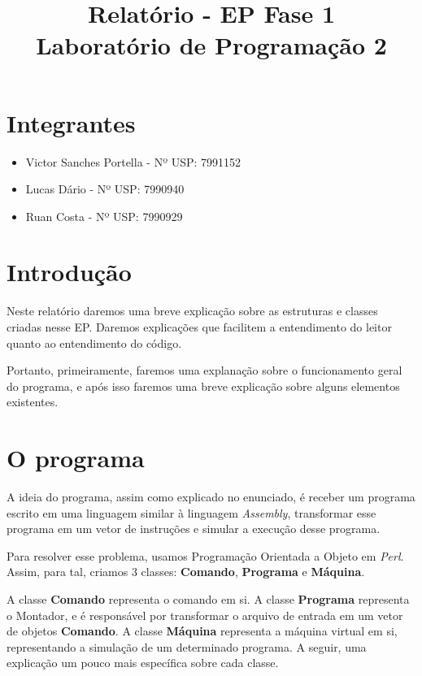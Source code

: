 \documentclass[11pt]{article}
\title{Relatório - EP Fase 1 \\ Laboratório de Programação 2}
\begin{document}
\maketitle

\section{Integrantes}

\begin{itemize}

\item Victor Sanches Portella - Nº USP: 7991152

\item Lucas Dário - Nº USP: 7990940

\item Ruan Costa - Nº USP: 7990929

\end{itemize}


\section{Introdução}

Neste relatório daremos uma breve explicação sobre as estruturas e classes
criadas nesse EP. Daremos explicações que facilitem a entendimento do leitor quanto ao entendimento do código.

Portanto, primeiramente, faremos uma explanação sobre o funcionamento geral do programa, e após isso faremos uma breve explicação sobre alguns elementos existentes.

\section{O programa}

A ideia do programa, assim como explicado no enunciado, é receber um programa escrito em uma linguagem similar à linguagem \emph{Assembly}, transformar esse programa em um vetor de instruções e simular a execução desse programa.

Para resolver esse problema, usamos Programação Orientada a Objeto em \emph{Perl}. Assim, para tal, criamos 3 classes: \textbf{\color{red}Comando}, \textbf{\color{red}Programa} e \textbf{\color{red}Máquina}.

A classe \textbf{\color{red}Comando} representa o comando em si. A classe \textbf{\color{red}Programa} representa o Montador, e é responsável por transformar o arquivo de entrada em um vetor de objetos \textbf{\color{red}Comando}. A classe \textbf{\color{red}Máquina} representa a máquina virtual em si, representando a simulação de um determinado programa. A seguir, uma explicação um pouco mais específica sobre cada classe.
\end{document}
